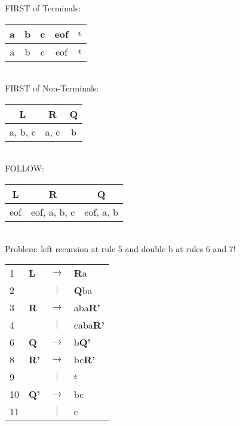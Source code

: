 \documentclass[11pt]{article} %
\begin{document}
\noindent FIRST of Terminals: \\

\begin{tabular}{|c|c|c|c|c|} \hline 
\textbf{a}
& \textbf{b}
& \textbf{c}
& \textbf{eof}
& \textbf{$\epsilon$}\\\hline 

a
& b
& c
& eof
& $\epsilon$\\\hline  
\end{tabular} \\

\noindent FIRST of Non-Terminals: \\

\begin{tabular}{|c|c|c|} \hline 
\textbf{L}
& \textbf{R}
& \textbf{Q} \\\hline 

a, b, c
& a, c
& b \\\hline  
\end{tabular} \\

\noindent FOLLOW: \\

\begin{tabular}{|c|c|c|} \hline 
\textbf{L}
& \textbf{R}
& \textbf{Q} \\\hline 

eof
& eof, a, b, c
& eof, a, b \\\hline  
\end{tabular} \\

\noindent Problem: left recursion at rule 5 and double b at rules 6 and 7!  \\

\begin{tabular}{llcl}
1
& \textbf{L}
& $\rightarrow$
& \textbf{R}a \\

2
& 
& $\vert$
& \textbf{Q}ba \\

3
& \textbf{R}
& $\rightarrow$
& aba\textbf{R'} \\

4
& 
& $\vert$
& caba\textbf{R'} \\

6
& \textbf{Q}
& $\rightarrow$
& b\textbf{Q'} \\

8
& \textbf{R'}
& $\rightarrow$
& bc\textbf{R'} \\

9
& 
& $\vert$
& $\epsilon$ \\

10
& \textbf{Q'}
& $\rightarrow$
& bc \\

11
& 
& $\vert$
& c \\
\end{tabular} \\
\end{document}
